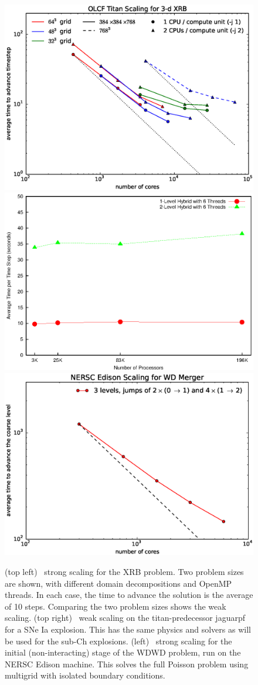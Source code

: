\documentclass[11pt,letterpaper,english]{article}
\begin{document}
\begin{figure}[t]
\centering
\includegraphics[width=0.49\linewidth]{xrb_titan_scaling_by_grid}
\includegraphics[width=0.49\linewidth]{castro_scaling} \\[0.5em]
\includegraphics[width=0.49\linewidth]{edison-wdmerger-scaling.eps}
\begin{minipage}[b]{0.5\linewidth}
\caption{\label{fig:scaling} (top left) \maestro\ strong scaling for
  the XRB problem.  Two problem sizes are shown, with 
  different domain decompositions and OpenMP
  threads.  In each case, the time to advance the solution is the
  average of 10 steps.  Comparing the two problem sizes shows the weak
  scaling.  (top right) \castro\ weak scaling on the titan-predecessor
  jaguarpf for a SNe Ia explosion.  This has the same physics and
  solvers as will be used for the sub-Ch explosions. (left)
  \castro\ strong scaling for the initial (non-interacting) stage of
  the WDWD problem, run on the NERSC Edison machine.  This solves the
  full Poisson problem using multigrid with isolated boundary
  conditions.}
\end{minipage}
\end{figure}
\end{document}
